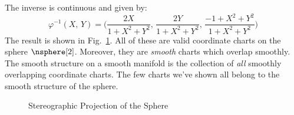 \documentclass{book}                                                            %
\begin{document}
                The inverse is continuous and given by:
                \begin{equation}
                    \varphi^{\minus{1}}(X,\,Y)=
                    \Big(\frac{2X}{1+X^{2}+Y^{2}},\,
                         \frac{2Y}{1+X^{2}+Y^{2}},\,
                         \frac{\minus{1}+X^{2}+Y^{2}}{1+X^{2}+Y^{2}}\Big)
                \end{equation}
                The result is shown in Fig.~\ref{fig:Stereo_Proj}. All of these
                are valid coordinate charts on the sphere $\nsphere[2]$.
                Moreover, they are \textit{smooth} charts which overlap
                smoothly. The smooth structure on a smooth manifold is the
                collection of \textit{all} smoothly overlapping coordinate
                charts. The few charts we've shown all belong to the smooth
                structure of the sphere.
                \begin{figure}
                    \centering
                    \captionsetup{type=figure}
                    
                    \caption{Stereographic Projection of the Sphere}
                    \label{fig:Stereo_Proj}
                \end{figure}
\end{document}
